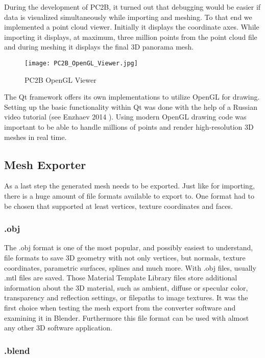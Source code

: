 During the development of PC2B, it turned out that debugging would be easier if data is visualized simultaneously while importing and meshing. To that end we implemented a point cloud viewer. Initially it displays the coordinate axes. While importing it displays, at maximum, three million points from the point cloud file and during meshing it displays the final 3D panorama mesh.

\begin{figure}[h]
	\centering
	\texttt{[image: PC2B\_OpenGL\_Viewer.jpg]}
	\caption{PC2B OpenGL Viewer}
	\label{fig:pc2b_opengl_viewer}
\end{figure}

The Qt framework offers its own implementations to utilize OpenGL for drawing. Setting up the basic functionality within Qt was done with the help of a Russian video tutorial (see Enzhaev 2014 \parencite{ytQtOpenGL}). Using modern OpenGL drawing code was important to be able to handle millions of points and render high-resolution 3D meshes in real time.


\subsection{Mesh Exporter}

As a last step the generated mesh needs to be exported. Just like for importing, there is a huge amount of file formats available to export to. One format had to be chosen that supported at least vertices, texture coordinates and faces.

\subsubsection{.obj}

The .obj format is one of the most popular, and possibly easiest to understand, file formats to save 3D geometry with not only vertices, but normals, texture coordinates, parametric surfaces, splines and much more. With .obj files, usually .mtl files are saved. Those Material Template Library files store additional information about the 3D material, such as ambient, diffuse or specular color, transparency and reflection settings, or filepaths to image textures. It was the first choice when testing the mesh export from the converter software and examining it in Blender. Furthermore this file format can be used with almost any other 3D software application.

\subsubsection{.blend}

